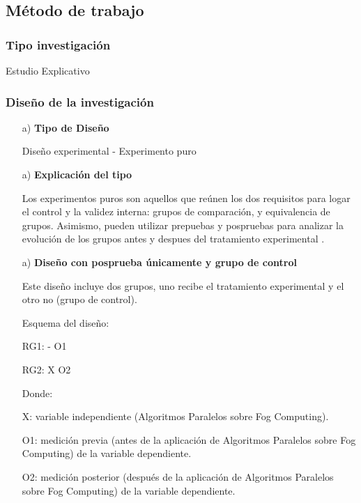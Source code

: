     \subsection{Método de trabajo}    
            \subsubsection{Tipo investigación}
                Estudio Explicativo
            \subsubsection{Diseño de la investigación}
                \begin{enumerate}
                    \item[a)]{\bf Tipo de Diseño}\par
                        Diseño experimental - Experimento puro 
                    \item[a)]{\bf Explicación del tipo}\par
                        Los experimentos puros son aquellos que reúnen los dos requisitos para logar el control y la validez interna: grupos de comparación, y equivalencia de grupos. Asimismo, pueden utilizar prepuebas y pospruebas para analizar la evolución de los grupos antes y despues del tratamiento experimental {\cite{sampieri1997}}. 
                    \item[a)]{\bf Diseño con posprueba únicamente y grupo de control}\par
                        Este diseño incluye dos grupos, uno recibe el tratamiento experimental y el otro no (grupo  de control).\par
                        Esquema del diseño:\par
                        \begin{center}
                            { RG1: - { }O1}\par
                            { RG2: X O2}\par
                        \end{center} 
                        Donde:\par 
                        X: variable independiente (Algoritmos Paralelos sobre Fog Computing).\par
                        O1: medición previa (antes de la aplicación de Algoritmos Paralelos sobre Fog Computing) de la variable dependiente.\par
                        O2: medición posterior (después de la aplicación de Algoritmos Paralelos sobre Fog Computing) de la variable dependiente.\par
                \end{enumerate}  
